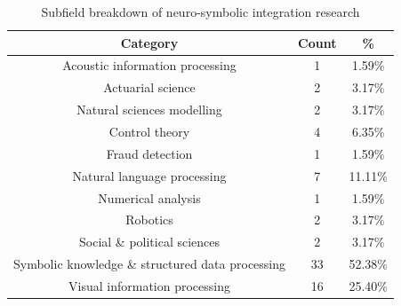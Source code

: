 \begin{table}[!htbp]
\centering
\begin{tabular}{ |c|c|c| }
 \hline
 \textbf{Category} & \textbf{Count} & \textbf{\%} \\
 \hline
 Acoustic information processing & 1 & 1.59\% \\
 \hline
 Actuarial science & 2 & 3.17\% \\
 \hline
 Natural sciences modelling & 2 & 3.17\% \\
 \hline
 Control theory & 4 & 6.35\% \\
 \hline
 Fraud detection & 1 & 1.59\% \\
 \hline
 Natural language processing & 7 & 11.11\% \\
 \hline
 Numerical analysis & 1 & 1.59\% \\
 \hline
 Robotics & 2 & 3.17\% \\
 \hline
 Social \& political sciences & 2 & 3.17\% \\
 \hline
 Symbolic knowledge \& structured data processing & 33 & 52.38\%  \\
 \hline
 Visual information processing & 16 & 25.40\%  \\
 \hline
\end{tabular}
\caption{Subfield breakdown of neuro-symbolic integration research}
\label{subject_breakdown}
\end{table}
